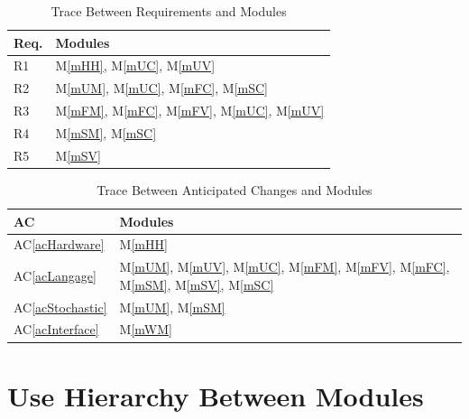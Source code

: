 \documentclass[12pt, titlepage]{article}
\newcommand{\acref}[1]{AC\ref{#1}}
\newcommand{\mref}[1]{M\ref{#1}}
\begin{document}
\begin{table}[H]
\centering
\begin{tabular}{p{} p{}}
\toprule
\textbf{Req.} & \textbf{Modules}\\
\midrule
R1 & \mref{mHH}, \mref{mUC}, \mref{mUV}\\
R2 & \mref{mUM}, \mref{mUC}, \mref{mFC}, \mref{mSC}\\
R3 & \mref{mFM}, \mref{mFC}, \mref{mFV}, \mref{mUC}, \mref{mUV}\\
R4 & \mref{mSM}, \mref{mSC}\\
R5 & \mref{mSV}\\

\bottomrule
\end{tabular}
\caption{Trace Between Requirements and Modules}
\label{TblRT}
\end{table}

\begin{table}[H]
\centering
\begin{tabular}{p{} p{}}
\toprule
\textbf{AC} & \textbf{Modules}\\
\midrule
\acref{acHardware} & \mref{mHH}\\
\acref{acLangage} & \mref{mUM}, \mref{mUV}, \mref{mUC}, \mref{mFM}, \mref{mFV}, \mref{mFC}, \mref{mSM}, \mref{mSV}, \mref{mSC}\\
\acref{acStochastic} & \mref{mUM}, \mref{mSM}\\
\acref{acInterface} & \mref{mWM}\\
\bottomrule
\end{tabular}
\caption{Trace Between Anticipated Changes and Modules}
\label{TblACT}
\end{table}

\section{Use Hierarchy Between Modules} \label{SecUse}
\end{document}
